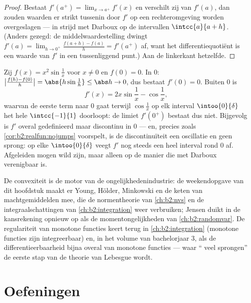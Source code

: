 \begin{proof}
Bestaat $f'(a^+) = \lim_{x\to a^+} f'(x)$ en verschilt zij van
$f'(a)$, dan zouden waarden er strikt tussenin door $f'$ op een
rechteromgeving worden overgeslagen --- in strijd met Darboux op de
intervallen $\intcc{a}{a + h}$. (Anders gezegd: de
middelwaardestelling dwingt $f'(a) = \lim_{h\to0^+}
\frac{f(a+h)-f(a)}{h} = f'(a^+)$ af, want het differentiequotiënt
is een waarde van $f'$ in een tussenliggend punt.) Aan de
linkerkant hetzelfde.
\end{proof}

\begin{example}\label{ex:b2:realfun:oscillation}
Zij $f(x) = x^2\sin\frac1x$ voor $x \neq 0$ en $f(0) = 0$. In $0$:
$\bigl|\frac{f(h) - f(0)}{h}\bigr| = \abs{h\sin\frac1h} \leq
\abs h \to 0$, dus bestaat $f'(0) = 0$. Buiten $0$ is
\[
f'(x) = 2x\sin\frac1x - \cos\frac1x ,
\]
waarvan de eerste term naar $0$ gaat terwijl $\cos\frac1x$ op elk
interval $\intoo{0}{\delta}$ het hele $\intcc{-1}{1}$ doorloopt: de
limiet $f'(0^+)$ bestaat dus niet. Bijgevolg is $f'$ overal
gedefinieerd maar discontinu in $0$ --- en, precies zoals
\cref{cor:b2:realfun:nojumps} voorspelt, is de discontinuïteit een
oscillatie en geen sprong: op elke $\intoo{0}{\delta}$ veegt $f'$
nog steeds een heel interval rond $0$ af. Afgeleiden mogen wild
zijn, maar alleen op de manier die met Darboux verenigbaar is.
\end{example}

\begin{remark}
De convexiteit is de motor van de ongelijkhedenindustrie: de
weekendopgave van dit hoofdstuk maakt er Young, Hölder, Minkowski
en de keten van machtgemiddelden mee, die de normentheorie van
\cref{ch:b2:nvs} en de integraalschattingen van
\cref{ch:b2:integration} weer verbruiken; Jensen duikt in de
kansrekening opnieuw op als de momentongelijkheden van
\cref{ch:b2:randomvar}. De regulariteit van monotone functies keert
terug in \cref{ch:b2:integration} (monotone functies zijn
integreerbaar) en, in het volume van bachelorjaar 3, als de
differentieerbaarheid bijna overal van monotone functies --- waar
`` veel sprongen'' de eerste stap van de theorie van
Lebesgue wordt.
\end{remark}

\section{Oefeningen}

